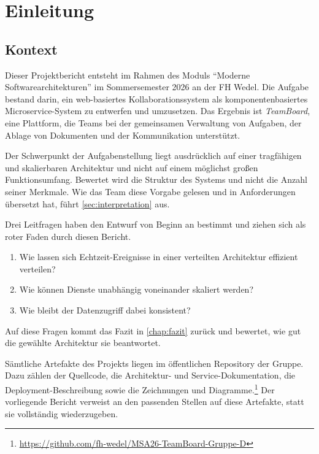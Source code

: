 \chapter{Einleitung}
\label{chap:einleitung}

\section{Kontext}
\label{sec:kontext}

Dieser Projektbericht entsteht im Rahmen des Moduls \enquote{Moderne Softwarearchitekturen} im Sommersemester 2026 an der FH Wedel. Die Aufgabe bestand darin, ein web-basiertes Kollaborationssystem als komponentenbasiertes Microservice-System zu entwerfen und umzusetzen. Das Ergebnis ist \emph{TeamBoard}, eine Plattform, die Teams bei der gemeinsamen Verwaltung von Aufgaben, der Ablage von Dokumenten und der Kommunikation unterstützt.

Der Schwerpunkt der Aufgabenstellung liegt ausdrücklich auf einer tragfähigen und skalierbaren Architektur und nicht auf einem möglichst großen Funktionsumfang. Bewertet wird die Struktur des Systems und nicht die Anzahl seiner Merkmale. Wie das Team diese Vorgabe gelesen und in Anforderungen übersetzt hat, führt \vref{sec:interpretation} aus.

Drei Leitfragen haben den Entwurf von Beginn an bestimmt und ziehen sich als roter Faden durch diesen Bericht.

\begin{enumerate}
  \item Wie lassen sich Echtzeit-Ereignisse in einer verteilten Architektur effizient verteilen?
  \item Wie können Dienste unabhängig voneinander skaliert werden?
  \item Wie bleibt der Datenzugriff dabei konsistent?
\end{enumerate}

Auf diese Fragen kommt das Fazit in \vref{chap:fazit} zurück und bewertet, wie gut die gewählte Architektur sie beantwortet.

Sämtliche Artefakte des Projekts liegen im öffentlichen Repository der Gruppe. Dazu zählen der Quellcode, die Architektur- und Service-Dokumentation, die Deployment-Beschreibung sowie die Zeichnungen und Diagramme.\footnote{\url{https://github.com/fh-wedel/MSA26-TeamBoard-Gruppe-D}} Der vorliegende Bericht verweist an den passenden Stellen auf diese Artefakte, statt sie vollständig wiederzugeben.

